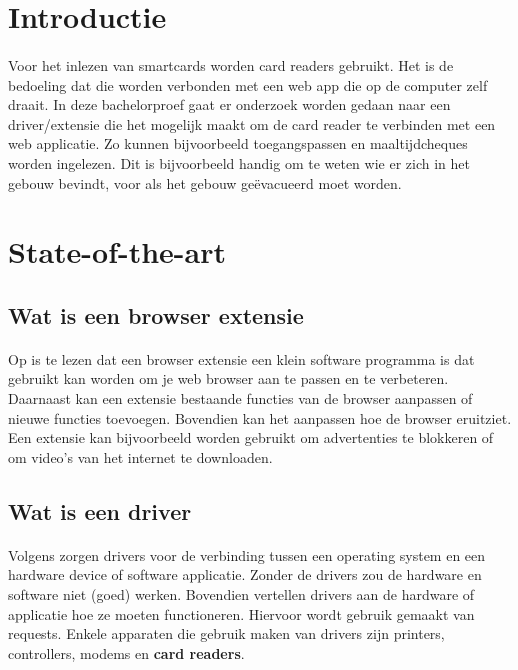 
\section{Introductie}%
\label{sec:introductie}
\paragraph{}
Voor het inlezen van smartcards worden card readers gebruikt. Het is de bedoeling dat die worden verbonden met een web app die op de computer zelf draait. In deze bachelorproef gaat er onderzoek worden gedaan naar een driver/extensie die het mogelijk maakt om de card reader te verbinden met een web applicatie. Zo kunnen bijvoorbeeld toegangspassen en maaltijdcheques worden ingelezen. Dit is bijvoorbeeld handig om te weten wie er zich in het gebouw bevindt, voor als het gebouw geëvacueerd moet worden.


\section{State-of-the-art}%
\label{sec:state-of-the-art}

\bigskip
\subsection{Wat is een browser extensie}
\paragraph{}
Op \textcite{Desktop.com} is te lezen dat een browser extensie een klein software programma is dat gebruikt kan worden om je web browser aan te passen en te verbeteren. Daarnaast kan een extensie bestaande functies van de browser aanpassen of nieuwe functies toevoegen. Bovendien kan het aanpassen hoe de browser eruitziet.
Een extensie kan bijvoorbeeld worden gebruikt om advertenties te blokkeren of om video's van het internet te downloaden.

\bigskip
\subsection{Wat is een driver}
\paragraph{}
Volgens \textcite{Webopedia} zorgen drivers voor de verbinding tussen een operating system en een hardware device of software applicatie. Zonder de drivers zou de hardware en software niet (goed) werken. Bovendien vertellen drivers aan de hardware of applicatie hoe ze moeten functioneren. Hiervoor wordt gebruik gemaakt van requests. Enkele apparaten die gebruik maken van drivers zijn printers, controllers, modems en \textbf{card readers}.

